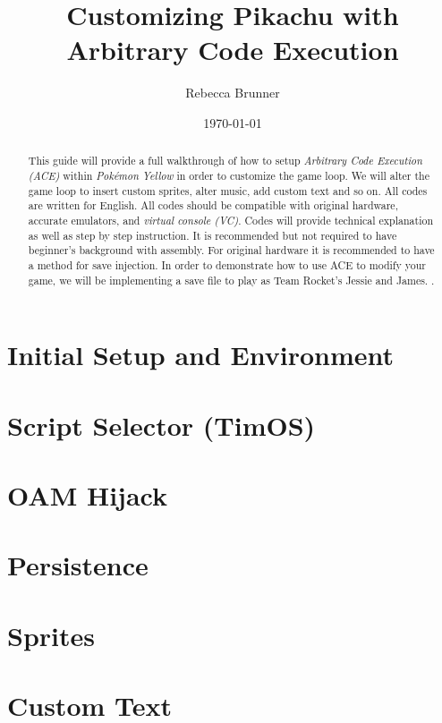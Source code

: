 \documentclass[12pt]{article}
\title{Customizing Pikachu with Arbitrary Code Execution}
\author{Rebecca Brunner}
\date{\today}
\newcommand{\selector}{TimOS}
\begin{document}
    \begin{titlepage}
        \vspace*{\fill}
        \vbox{
            \clearpage
            \maketitle
            \thispagestyle{empty}
        }
        \vspace*{\fill}
        \vspace*{\fill}
    \end{titlepage}

    \begin{abstract}
        This guide will provide a full walkthrough of how to setup \textit{Arbitrary Code Execution (ACE)} within \textit{Pokémon Yellow} in order to customize the game loop.  We will alter the game loop to insert custom sprites, alter music, add custom text and so on.  All codes are written for English.  All codes should be compatible with original hardware, accurate emulators, and \textit{virtual console (VC)}.  Codes will provide technical explanation as well as step by step instruction.  It is recommended but not required to have beginner's background with assembly.  For original hardware it is recommended to have a method for save injection.  In order to demonstrate how to use ACE to modify your game, we will be implementing a save file to play as Team Rocket's Jessie and James. \cite{example}.
    \end{abstract}

    \tableofcontents

    \newpage

    \section{Initial Setup and Environment}
    
    \newpage

    \section{Script Selector (\selector{})}
    
    \newpage

    \section{OAM Hijack}
    
    \newpage

    \section{Persistence}
    
    \newpage

    \section{Sprites}
    
    \newpage

    \section{Custom Text}
    
    \newpage

    \printbibliography
\end{document}
